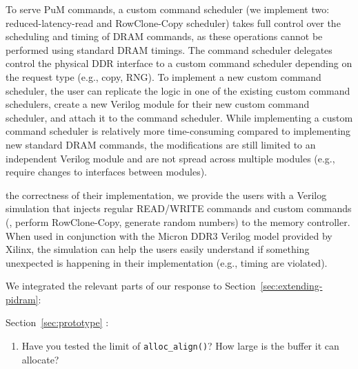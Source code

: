 To serve PuM commands, a custom command scheduler (we implement two: reduced-latency-read and RowClone-Copy scheduler) takes full control over the scheduling and timing of DRAM commands, as these operations cannot be performed using standard DRAM timings. The command scheduler delegates control  the physical DDR interface to a custom command scheduler depending on the request type (e.g., copy, RNG). To implement a new custom command scheduler, the user can replicate the logic in one of the existing custom command schedulers, create a new Verilog module for their new custom command scheduler, and attach it to the command scheduler. While implementing a custom command scheduler is relatively more time-consuming compared to implementing new standard DRAM commands, the modifications are still limited to an independent Verilog module and are not spread across multiple modules (e.g.,  require changes to interfaces between modules).

 the correctness of their implementation, we provide the users with a Verilog simulation  that injects regular READ/WRITE commands and custom commands (, perform RowClone-Copy, generate random numbers) to the memory controller. When used in conjunction with the Micron DDR3 Verilog model provided by Xilinx, the simulation  can help the users easily understand if something unexpected is happening in their implementation (e.g.,  timing  are violated).

We integrated the relevant parts of our response to Section~\ref{sec:extending-pidram}:\\

\vspace{5pt}
\yyboxbegin
\yyboxend

 Section~\ref{sec:prototype} :\\

\yyboxbegin
\yyboxend

\bigbreak
\begin{tcolorbox}
    \begin{enumerate}[label=R1/\arabic*]
        \addtocounter{enumi}{1}
        \item \label{q:r1q2} Have you tested the limit of \texttt{alloc\_align()}? How large is the buffer it can allocate?
    \end{enumerate}
\end{tcolorbox} 

